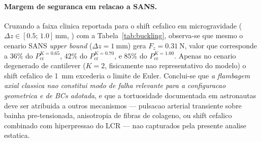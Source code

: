 \paragraph{Margem de seguranca em relacao a SANS.} Cruzando a faixa clinica reportada para o shift cefalico em microgravidade ($\Delta z \in [0.5;\, 1.0]\,\si{\milli\meter}$, \citet{Lee2020NPJ}) com a Tabela~\ref{tab:buckling}, observa-se que mesmo o cenario SANS \emph{upper bound} ($\Delta z = \SI{1}{\milli\meter}$) gera $F_z = \SI{0.31}{\newton}$, valor que corresponde a $36\%$ do $P_{\mathrm{cr}}^{K=0.65}$, $42\%$ do $P_{\mathrm{cr}}^{K=0.70}$, e $85\%$ do $P_{\mathrm{cr}}^{K=1.00}$. Apenas no cenario degenerado de cantilever ($K = 2$, fisicamente nao representativo do modelo) o shift cefalico de \SI{1}{\milli\meter} excederia o limite de Euler. Conclui-se que \emph{a flambagem axial classica nao constitui modo de falha relevante para a configuracao geometrica e de BCs adotada}, e que a tortuosidade documentada em astronautas deve ser atribuida a outros mecanismos --- pulsacao arterial transiente sobre bainha pre-tensionada, anisotropia de fibras de colageno, ou shift cefalico combinado com hiperpressao do LCR --- nao capturados pela presente analise estatica.

